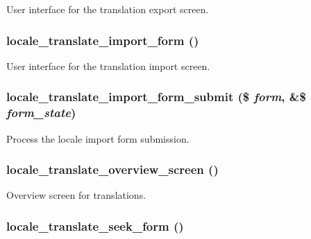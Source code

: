 User interface for the translation export screen. \hypertarget{group__locale_gfe5de636ff53a23b1da268287aec6ecf}{
\subsubsection[{locale\_\-translate\_\-import\_\-form}]{\setlength{\rightskip}{0pt plus 5cm}locale\_\-translate\_\-import\_\-form ()}}
\label{group__locale_gfe5de636ff53a23b1da268287aec6ecf}


User interface for the translation import screen. \hypertarget{group__locale_gb96d979ef16a3468061ebb7e11e3210e}{
\subsubsection[{locale\_\-translate\_\-import\_\-form\_\-submit}]{\setlength{\rightskip}{0pt plus 5cm}locale\_\-translate\_\-import\_\-form\_\-submit (\$ {\em form}, \/  \&\$ {\em form\_\-state})}}
\label{group__locale_gb96d979ef16a3468061ebb7e11e3210e}


Process the locale import form submission. \hypertarget{group__locale_gc36ea050ad5c0a75624c1a9b63c343a0}{
\subsubsection[{locale\_\-translate\_\-overview\_\-screen}]{\setlength{\rightskip}{0pt plus 5cm}locale\_\-translate\_\-overview\_\-screen ()}}
\label{group__locale_gc36ea050ad5c0a75624c1a9b63c343a0}


Overview screen for translations. \hypertarget{group__locale_g6c5573388bc6f44b3743165fb3401b6c}{
\subsubsection[{locale\_\-translate\_\-seek\_\-form}]{\setlength{\rightskip}{0pt plus 5cm}locale\_\-translate\_\-seek\_\-form ()}}
\label{group__locale_g6c5573388bc6f44b3743165fb3401b6c}


